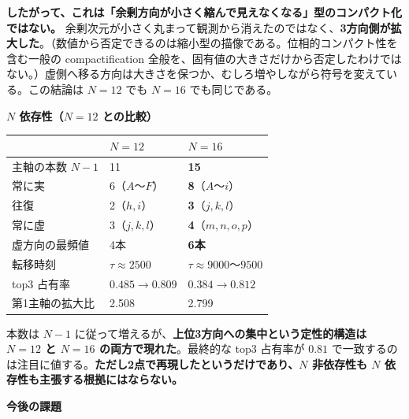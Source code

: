 \documentclass[
  10pt,
]{ltjsarticle}
\newcounter{none} %
\begin{document}
\textbf{したがって、これは「余剰方向が小さく縮んで見えなくなる」型のコンパクト化ではない。}
余剰次元が小さく丸まって観測から消えたのではなく、\textbf{3方向側が拡大した}。（数値から否定できるのは縮小型の描像である。位相的コンパクト性を含む一般の
compactification
全般を、固有値の大きさだけから否定したわけではない。）虚側へ移る方向は大きさを保つか、むしろ増やしながら符号を変えている。この結論は
\(N=12\) でも \(N=16\) でも同じである。

\textbf{\(N\) 依存性（\(N=12\) との比較）}

{\def\LTcaptype{none} %
\begin{longtable}[]{@{}lll@{}}
\toprule\noalign{}
& \(N=12\) & \(N=16\) \\
\midrule\noalign{}
\endhead
\bottomrule\noalign{}
\endlastfoot
主軸の本数 \(N-1\) & 11 & \textbf{15} \\
常に実 & 6（\(A\)〜\(F\)） & \textbf{8}（\(A\)〜\(i\)） \\
往復 & 2（\(h,i\)） & \textbf{3}（\(j,k,l\)） \\
常に虚 & 3（\(j,k,l\)） & \textbf{4}（\(m,n,o,p\)） \\
虚方向の最頻値 & 4本 & \textbf{6本} \\
転移時刻 & \(\tau \approx 2500\) & \(\tau \approx 9000\)〜\(9500\) \\
top3 占有率 & \(0.485 \to 0.809\) & \(0.384 \to 0.812\) \\
第1主軸の拡大比 & 2.508 & 2.799 \\
\end{longtable}
}

本数は \(N-1\)
に従って増えるが、\textbf{上位3方向への集中という定性的構造は \(N=12\)
と \(N=16\) の両方で現れた}。最終的な top3 占有率が \(0.81\)
で一致するのは注目に値する。\textbf{ただし2点で再現したというだけであり、\(N\)
非依存性も \(N\) 依存性も主張する根拠にはならない。}

\textbf{今後の課題}
\end{document}
